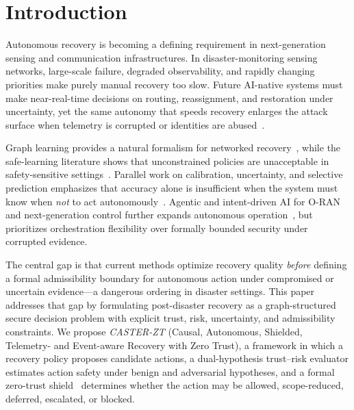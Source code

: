 \section{Introduction}
\label{art3:sec:introduction}

Autonomous recovery is becoming a defining requirement in next-generation sensing and communication infrastructures.
In disaster-monitoring sensing networks, large-scale failure, degraded observability, and rapidly changing priorities make purely manual recovery too slow.
Future AI-native systems must make near-real-time decisions on routing, reassignment, and restoration under uncertainty, yet the same autonomy that speeds recovery enlarges the attack surface when telemetry is corrupted or identities are abused~\cite{amodei2016concrete,rose2020nist}.

Graph learning provides a natural formalism for networked recovery~\cite{kipf2017gcn,hamilton2017graphsage,velickovic2018gat}, while the safe-learning literature shows that unconstrained policies are unacceptable in safety-sensitive settings~\cite{garcia2015saferl,achiam2017cpo,alshiekh2018shielding}.
Parallel work on calibration, uncertainty, and selective prediction emphasizes that accuracy alone is insufficient when the system must know when \emph{not} to act autonomously~\cite{gal2016dropout,angelopoulos2023conformal}.
Agentic and intent-driven AI for O-RAN and next-generation control further expands autonomous operation~\cite{toward_autonomous_oran_2026,oran_official_architecture}, but prioritizes orchestration flexibility over formally bounded security under corrupted evidence.

The central gap is that current methods optimize recovery quality \emph{before} defining a formal admissibility boundary for autonomous action under compromised or uncertain evidence---a dangerous ordering in disaster settings.
This paper addresses that gap by formulating post-disaster recovery as a graph-structured secure decision problem with explicit trust, risk, uncertainty, and admissibility constraints.
We propose \emph{CASTER-ZT} (Causal, Autonomous, Shielded, Telemetry- and Event-aware Recovery with Zero Trust), a framework in which a recovery policy proposes candidate actions, a dual-hypothesis trust--risk evaluator estimates action safety under benign and adversarial hypotheses, and a formal zero-trust shield~\cite{rose2020nist} determines whether the action may be allowed, scope-reduced, deferred, escalated, or blocked.

